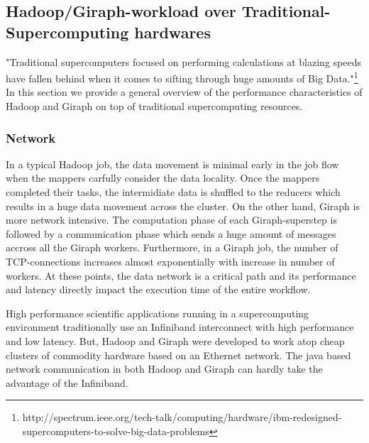 \documentclass[conference]{IEEEtran}
\begin{document}
\subsection {Hadoop/Giraph-workload over Traditional-Supercomputing hardwares}
"Traditional supercomputers focused on performing calculations at blazing speeds have fallen behind when it comes to sifting through huge amounts of Big Data."\footnote{http://spectrum.ieee.org/tech-talk/computing/hardware/ibm-redesigned-supercomputers-to-solve-big-data-problems}
In this section we provide a general overview of the performance characteristics of Hadoop and Giraph on top of traditional supercomputing resources.
\subsubsection {Network}
In a typical Hadoop job, the data movement is minimal early in the job flow when the mappers carfully consider the data locality. 
Once the mappers completed their tasks, the intermidiate data is shuffled to the reducers which results in a huge data movement across the cluster. 
On the other hand,  Giraph is more network intensive. The computation phase of each Giraph-superstep is followed by a communication phase which sends a huge amount of messages accross all the Giraph workers.
Furthermore, in a Giraph job, the number of TCP-connections increases almost exponentially with increase in number of workers.
At these points, the data network is a critical path and its performance and latency directly impact the execution time of the entire workflow.

High performance scientific applications running in a supercomputing environment traditionally use an Infiniband interconnect with high performance and low latency.
But, Hadoop and Giraph were developed to work atop cheap clusters of commodity hardware based on an Ethernet network.
The java based network communication in both Hadoop and Giraph can hardly take the advantage of the Infiniband.
\end{document}
